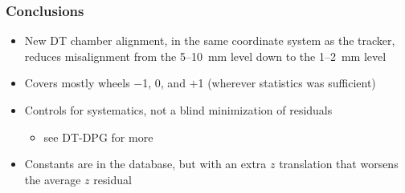\documentclass[compress]{beamer}
\begin{document}
\begin{frame}
\frametitle{Conclusions}
\begin{itemize}\setlength{\itemsep}{0.25 cm}
\item New DT chamber alignment, in the same coordinate system as the tracker, reduces misalignment from the 5--10~mm level down to the 1--2~mm level
\item Covers mostly wheels $-$1, 0, and $+$1 (wherever statistics was sufficient)
\item Controls for systematics, not a blind minimization of residuals
\begin{itemize}
\item see DT-DPG for more
\end{itemize}
\item Constants are in the database, but with an extra $z$ translation
  that worsens the average $z$ residual
\end{itemize}
\label{numpages}
\end{frame}
\end{document}
